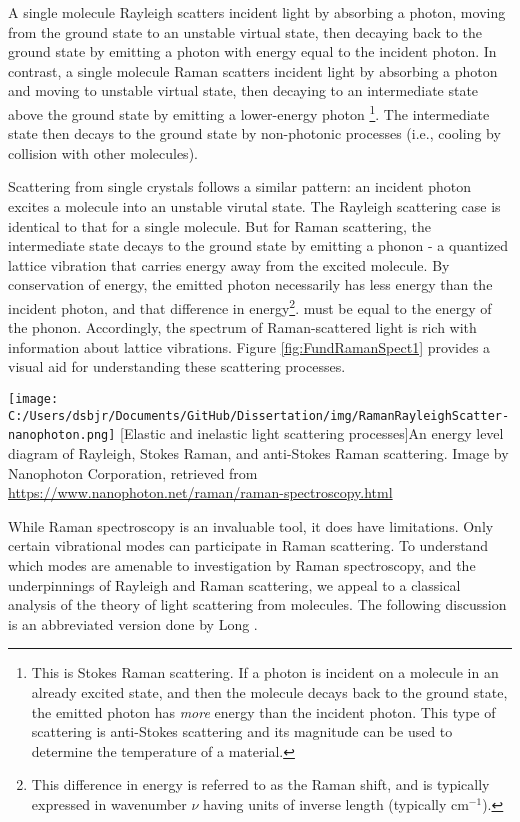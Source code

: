 A single molecule Rayleigh scatters incident light by absorbing a photon, moving from the ground state to an unstable virtual state, then decaying back to the ground state by emitting a photon with energy equal to the incident photon. In contrast, a single molecule Raman scatters incident light by absorbing a photon and moving to unstable virtual state, then decaying to an intermediate state above the ground state by emitting a lower-energy photon \footnote{This is Stokes Raman scattering. If a photon is incident on a molecule in an already excited state, and then the molecule decays back to the ground state, the emitted photon has \textit{more} energy than the incident photon. This type of scattering is anti-Stokes scattering and its magnitude can be used to determine the temperature of a material.}. The intermediate state then decays to the ground state by non-photonic processes (i.e., cooling by collision with other molecules).

Scattering from single crystals follows a similar pattern: an incident photon excites a molecule into an unstable virutal state. The Rayleigh scattering case is identical to that for a single molecule. But for Raman scattering, the intermediate state decays to the ground state by emitting a phonon - a quantized lattice vibration that carries energy away from the excited molecule. By conservation of energy, the emitted photon necessarily has less energy than the incident photon, and that difference in energy\footnote{This difference in energy is referred to as the Raman shift, and is typically expressed in wavenumber $\nu$ having units of inverse length (typically cm$^{-1}$).}. must be equal to the energy of the phonon. Accordingly, the spectrum of Raman-scattered light is rich with information about lattice vibrations. Figure \ref{fig:FundRamanSpect1} provides a visual aid for understanding these scattering processes.

\begin{centering}
\texttt{[image: C:/Users/dsbjr/Documents/GitHub/Dissertation/img/RamanRayleighScatter-nanophoton.png]}
  \captionsetup{width=0.75\textwidth}
  [Elastic and inelastic light scattering processes]{An energy level diagram of Rayleigh, Stokes Raman, and anti-Stokes Raman scattering. Image by Nanophoton Corporation, retrieved from \url{https://www.nanophoton.net/raman/raman-spectroscopy.html}}
  \label{fig:FundRamanSpect1}
\end{centering}

While Raman spectroscopy is an invaluable tool, it does have limitations. Only certain vibrational modes can participate in Raman scattering. To understand which modes are amenable to investigation by Raman spectroscopy, and the underpinnings of Rayleigh and Raman scattering, we appeal to a classical analysis of the theory of light scattering from molecules. The following discussion is an abbreviated version done by Long \cite{Long2002}.

